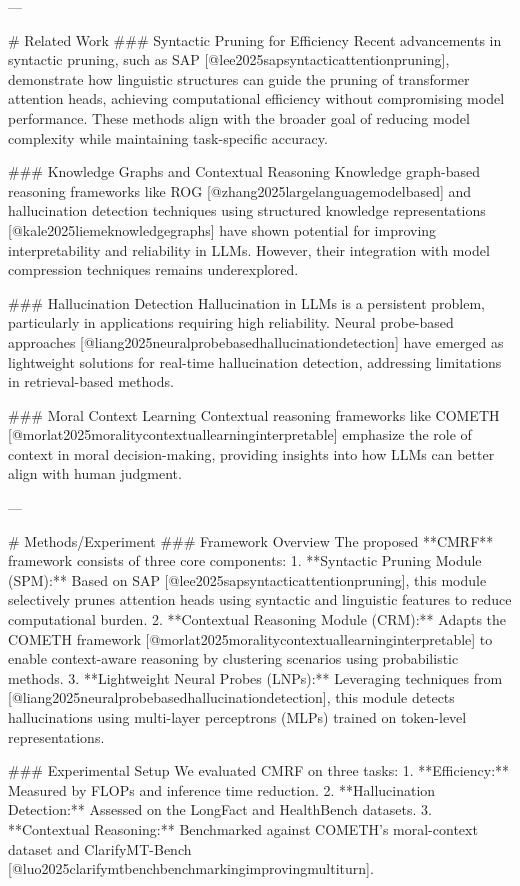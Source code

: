 ---

# Related Work
### Syntactic Pruning for Efficiency
Recent advancements in syntactic pruning, such as SAP [@lee2025sapsyntacticattentionpruning], demonstrate how linguistic structures can guide the pruning of transformer attention heads, achieving computational efficiency without compromising model performance. These methods align with the broader goal of reducing model complexity while maintaining task-specific accuracy.

### Knowledge Graphs and Contextual Reasoning
Knowledge graph-based reasoning frameworks like ROG [@zhang2025largelanguagemodelbased] and hallucination detection techniques using structured knowledge representations [@kale2025liemeknowledgegraphs] have shown potential for improving interpretability and reliability in LLMs. However, their integration with model compression techniques remains underexplored.

### Hallucination Detection
Hallucination in LLMs is a persistent problem, particularly in applications requiring high reliability. Neural probe-based approaches [@liang2025neuralprobebasedhallucinationdetection] have emerged as lightweight solutions for real-time hallucination detection, addressing limitations in retrieval-based methods.

### Moral Context Learning
Contextual reasoning frameworks like COMETH [@morlat2025moralitycontextuallearninginterpretable] emphasize the role of context in moral decision-making, providing insights into how LLMs can better align with human judgment.

---

# Methods/Experiment
### Framework Overview
The proposed **CMRF** framework consists of three core components:
1. **Syntactic Pruning Module (SPM):** Based on SAP [@lee2025sapsyntacticattentionpruning], this module selectively prunes attention heads using syntactic and linguistic features to reduce computational burden.
2. **Contextual Reasoning Module (CRM):** Adapts the COMETH framework [@morlat2025moralitycontextuallearninginterpretable] to enable context-aware reasoning by clustering scenarios using probabilistic methods.
3. **Lightweight Neural Probes (LNPs):** Leveraging techniques from [@liang2025neuralprobebasedhallucinationdetection], this module detects hallucinations using multi-layer perceptrons (MLPs) trained on token-level representations.

### Experimental Setup
We evaluated CMRF on three tasks:
1. **Efficiency:** Measured by FLOPs and inference time reduction.
2. **Hallucination Detection:** Assessed on the LongFact and HealthBench datasets.
3. **Contextual Reasoning:** Benchmarked against COMETH's moral-context dataset and ClarifyMT-Bench [@luo2025clarifymtbenchbenchmarkingimprovingmultiturn].

